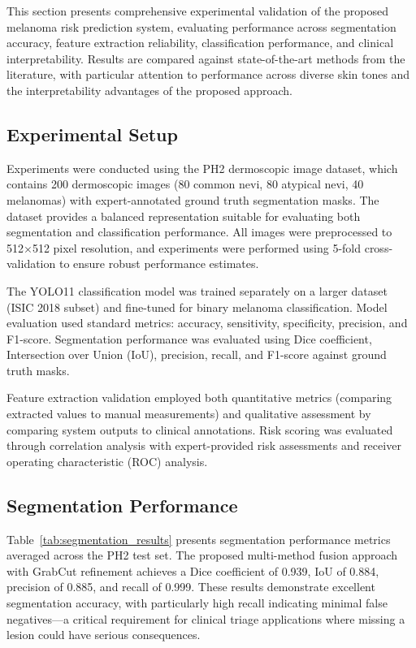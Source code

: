 \documentclass[conference]{IEEEtran}
\begin{document}
This section presents comprehensive experimental validation of the proposed melanoma risk prediction system, evaluating performance across segmentation accuracy, feature extraction reliability, classification performance, and clinical interpretability. Results are compared against state-of-the-art methods from the literature, with particular attention to performance across diverse skin tones and the interpretability advantages of the proposed approach.

\subsection{Experimental Setup}

Experiments were conducted using the PH2 dermoscopic image dataset, which contains 200 dermoscopic images (80 common nevi, 80 atypical nevi, 40 melanomas) with expert-annotated ground truth segmentation masks. The dataset provides a balanced representation suitable for evaluating both segmentation and classification performance. All images were preprocessed to 512×512 pixel resolution, and experiments were performed using 5-fold cross-validation to ensure robust performance estimates.

The YOLO11 classification model was trained separately on a larger dataset (ISIC 2018 subset) and fine-tuned for binary melanoma classification. Model evaluation used standard metrics: accuracy, sensitivity, specificity, precision, and F1-score. Segmentation performance was evaluated using Dice coefficient, Intersection over Union (IoU), precision, recall, and F1-score against ground truth masks.

Feature extraction validation employed both quantitative metrics (comparing extracted values to manual measurements) and qualitative assessment by comparing system outputs to clinical annotations. Risk scoring was evaluated through correlation analysis with expert-provided risk assessments and receiver operating characteristic (ROC) analysis.

\subsection{Segmentation Performance}

Table~\ref{tab:segmentation_results} presents segmentation performance metrics averaged across the PH2 test set. The proposed multi-method fusion approach with GrabCut refinement achieves a Dice coefficient of 0.939, IoU of 0.884, precision of 0.885, and recall of 0.999. These results demonstrate excellent segmentation accuracy, with particularly high recall indicating minimal false negatives—a critical requirement for clinical triage applications where missing a lesion could have serious consequences.
\end{document}
